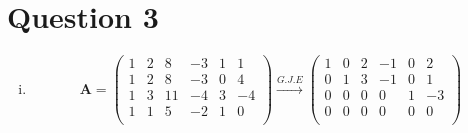 \documentclass{article}
\newcommand{\bs}[1]{\boldsymbol{#1}}
\begin{document}
\section*{Question 3}
\begin{enumerate}[(i)]
    \item 
$$\bs{A} = \left(\begin{array}{cccccc}
     1 & 2 & 8 & -3 & 1 & 1\\
     1 & 2 & 8 & -3 & 0 & 4\\
    1 & 3 & 11 & -4 & 3 & -4 \\
    1 & 1 & 5 & -2 & 1 & 0 \\
    \end{array}\right) \xrightarrow[]{G.J.E}\left(\begin{array}{cccccc}
     1 & 0 & 2 & -1 & 0 & 2\\
     0 & 1 & 3 & -1 & 0 & 1\\
    0 & 0 & 0 & 0 & 1 & -3 \\
    0 & 0 & 0 & 0 & 0 & 0 \\
    \end{array}\right)$$


\end{enumerate}
\end{document}
